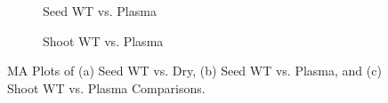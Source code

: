 \documentclass[12pt,letterpaper]{article}
\begin{document}
\begin{figure}[H]
\begin{subfigure}[b]{0.32\textwidth}
    \caption{Seed WT vs. Plasma}
    \label{fig:enter-label}
\end{subfigure}
\begin{subfigure}[b]{0.32\textwidth}
    \centering
    \caption{Shoot WT vs. Plasma}
    \label{fig:enter-label}
\end{subfigure}
\caption{MA Plots of (a) Seed WT vs. Dry, (b) Seed WT vs. Plasma, and (c) Shoot WT vs. Plasma Comparisons.}
\end{figure}
\end{document}
